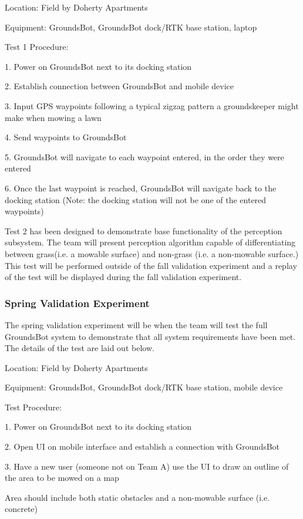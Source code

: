 \documentclass[12pt]{extarticle}
\begin{document}
Location: Field by Doherty Apartments

Equipment: GroundsBot, GroundsBot dock/RTK base station, laptop

Test 1 Procedure:

1. Power on GroundsBot next to its docking station

2. Establish connection between GroundsBot and mobile device

3. Input GPS waypoints following a typical zigzag pattern a groundskeeper might make when mowing a lawn

4. Send waypoints to GroundsBot

5. GroundsBot will navigate to each waypoint entered, in the order they were entered

6. Once the last waypoint is reached, GroundsBot will navigate back to the docking station (Note: the docking station will not be one of the entered waypoints)

Test 2 has been designed to demonstrate base functionality of the perception subsystem. The team will present perception algorithm capable of differentiating between grass(i.e. a mowable surface) and non-grass (i.e. a non-mowable surface.) This test will be performed outside of the fall validation experiment and a replay of the test will be displayed during the fall validation experiment.

\subsubsection{Spring Validation Experiment}

	The spring validation experiment will be when the team will test the full GroundsBot system to demonstrate that all system requirements have been met. The details of the test are laid out below.
	
Location: Field by Doherty Apartments

Equipment: GroundsBot, GroundsBot dock/RTK base station, mobile device

Test Procedure:

1. Power on GroundsBot next to its docking station

2. Open UI on mobile interface and establish a connection with GroundsBot

3. Have a new user (someone not on Team A) use the UI to draw an outline of the area to be mowed on a map

	Area should include both static obstacles and a non-mowable surface (i.e. concrete)
	
\end{document}
